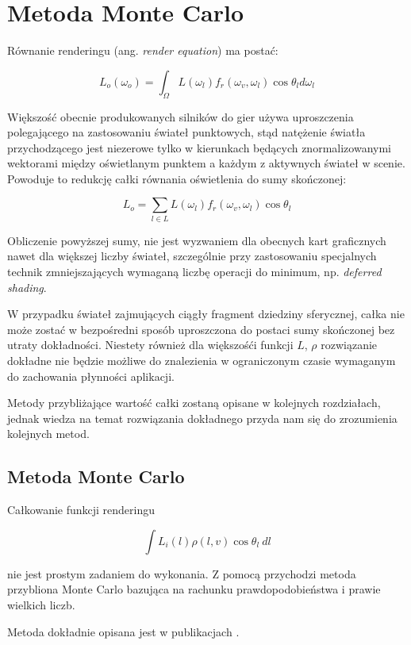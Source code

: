 \documentclass[../main.tex]{subfiles}
\begin{document}
\chapter{Metoda Monte Carlo}

Równanie renderingu (ang. \textit{render equation}) ma postać:

$$
L_o(\omega_o) = \int_{\Omega} {
    L(\omega_{l})
    f_r(\omega_{v}, \omega_{l})
    \cos \theta_{l}
    d\omega_{l}
}
$$

Większość obecnie produkowanych silników do gier używa uproszczenia
polegającego na zastosowaniu świateł punktowych, stąd natężenie światła
przychodzącego jest niezerowe tylko w kierunkach będących znormalizowanymi
wektorami między oświetlanym punktem a każdym z aktywnych świateł w scenie.
Powoduje to redukcję całki równania oświetlenia do sumy skończonej:

$$ L_o = \sum_{l \in L} L(\omega_l) f_r(\omega_v, \omega_l)\cos \theta_l $$

Obliczenie powyższej sumy, nie jest wyzwaniem dla obecnych kart graficznych
nawet dla większej liczby świateł, szczególnie przy zastosowaniu specjalnych
technik zmniejszających wymaganą liczbę operacji do minimum, np.
\textit{deferred shading}.

W przypadku świateł zajmujących ciągły fragment dziedziny sferycznej, całka nie
może zostać w bezpośredni sposób uproszczona do postaci sumy skończonej bez
utraty dokładności. Niestety również dla większośći funkcji $L$, $\rho$
rozwiązanie dokładne nie będzie możliwe do znalezienia w ograniczonym czasie
wymaganym do zachowania płynności aplikacji.

Metody przybliżające wartość całki zostaną opisane w kolejnych rozdziałach,
jednak wiedza na temat rozwiązania dokładnego przyda nam się do zrozumienia
kolejnych metod.

\section{Metoda Monte Carlo}

Całkowanie funkcji renderingu

$$
\int{
    L_i(l)
    \rho(l,v)
    \cos \theta_{l}
    \: dl
} $$

nie jest prostym zadaniem do wykonania. Z pomocą przychodzi metoda przybliona
Monte Carlo bazująca na rachunku prawdopodobieństwa i prawie wielkich liczb.

Metoda dokładnie opisana jest w publikacjach \cite{MonteCarloAnderson}
\cite{Veach}.
\end{document}
